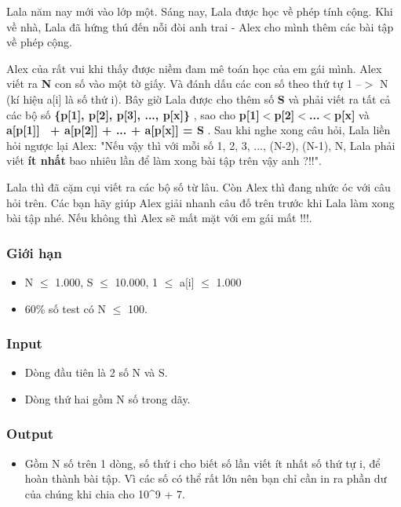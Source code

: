 



   Lala năm nay mới vào lớp một. Sáng nay, Lala được học về phép tính cộng. Khi về nhà, Lala đã hứng thú đến nỗi đòi anh trai - Alex cho mình thêm các bài tập về phép cộng.  

   Alex của rất vui khi thấy được niềm đam mê toán học của em gái mình. Alex viết ra   \textbf{    N   }   con số vào một tờ giấy. Và đánh dấu các con số theo thứ tự 1 --$>$ N (kí hiệu a[i] là số thứ i). Bây giờ Lala được cho thêm số   \textbf{    S   }   và phải viết ra   tất cả các bộ số\textbf{    \{p[1], p[2], p[3], ..., p[x]\}   }   ,   sao cho\textbf{    p[1]$<$p[2]$<$...$<$p[x]   }và\textbf{    a[p[1]]  + a[p[2]] + ... + a[p[x]] = S   }   . Sau khi nghe xong câu hỏi, Lala liền hỏi ngược lại Alex: "Nếu vậy thì với mỗi số 1, 2, 3, ..., (N-2), (N-1), N, Lala phải viết   \textbf{    ít nhất   }   bao nhiêu lần để làm xong bài tập trên vậy anh ?!!".  

   Lala thì đã cặm cụi viết ra các bộ số từ lâu. Còn Alex thì đang nhức óc với câu hỏi trên. Các bạn hãy giúp Alex giải nhanh câu đố trên trước khi Lala làm xong bài tập nhé. Nếu không thì Alex sẽ mất mặt với em gái mất !!!.  

\subsubsection{   Giới hạn  }
\begin{itemize}
	\item     N  $\le$  1.000, S  $\le$  10.000, 1 $\le$  a[i]  $\le$  1.000   
	\item     60\% số test có N  $\le$  100.   
\end{itemize}

\subsubsection{   Input  }
\begin{itemize}
	\item     Dòng đầu tiên là 2 số N và S.   
	\item     Dòng thứ hai gồm N số trong dãy.   
\end{itemize}

\subsubsection{   Output  }
\begin{itemize}
	\item     Gồm N số trên 1 dòng, số thứ i cho biết số lần viết        ít nhất    số thứ tự i,    để hoàn thành bài tập. Vì các số có thể rất lớn nên bạn chỉ cần in ra phần dư của chúng khi chia cho 10^9 + 7.   
\end{itemize}

